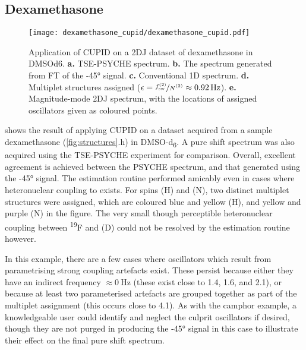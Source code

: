 \subsection{Dexamethasone}
\begin{sidewaysfigure}%
    \centering%
    \texttt{[image: dexamethasone\_cupid/dexamethasone\_cupid.pdf]}%
    \caption[
        Application of \acs{CUPID} on a dexamethasone dataset.
    ]{
        Application of \acs{CUPID} on a \ac{2DJ} dataset of dexamethasone in
        \acs{DMSOd6}.
        \textbf{a.} \acs{TSE-PSYCHE} spectrum.
        \textbf{b.} The spectrum generated from \ac{FT} of the \ang{-45}
        signal.
        \textbf{c.} Conventional \acs{1D} spectrum.
        \textbf{d.} Multiplet structures assigned ($\epsilon =
        \nicefrac{\fswtwo}{\Ntwo} \approx \qty{0.92}{\hertz}$).
        \textbf{e.} Magnitude-mode \acs{2DJ} spectrum, with the locations of
        assigned oscillators given as coloured points.
    }
    \label{fig:dexamethasone-cupid}%
\end{sidewaysfigure}%

 shows the result of applying CUPID on a
dataset acquired from a sample dexamethasone (\cref{fig:structures}.h) in DMSO-d\textsubscript{6}. A
pure shift spectrum was also acquired using the
\ac{TSE-PSYCHE} experiment\cite{Foroozandeh2018,Foroozandeh2015} for
comparison.
Overall, excellent agreement is achieved between the \ac{PSYCHE}
spectrum, and that generated using the \ang{-45} signal. The estimation routine
performed amicably even in cases where heteronuclear coupling to
 exists. For spins (H) and (N), two distinct
multiplet structures were assigned, which are coloured blue and yellow (H), and
yellow and purple (N) in the figure. The very small though perceptible
heteronuclear coupling between \textsuperscript{19}F and (D) could not be
resolved by the estimation routine however.

In this example, there are a few cases where oscillators which result from
parametrising strong coupling artefacts exist. These persist because
either they have an indirect frequency $\approx \qty{0}{\hertz}$ (these exist close to
\qty{1.4}{\partspermillion}, \qty{1.6}{\partspermillion}, and
\qty{2.1}{\partspermillion}), or because at
least two parameterised artefacts are grouped together as part of the multiplet
assignment (this occurs close to \qty{4.1}{\partspermillion}). As with the
camphor example, a knowledgeable user could identify and neglect the culprit
oscillators if desired, though they are not purged in producing the \ang{-45}
signal in this case to illustrate their effect on the final pure shift spectrum.

